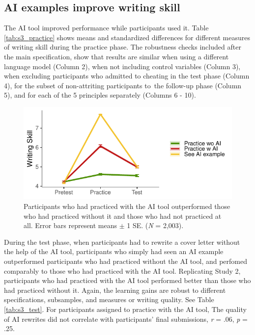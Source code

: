 \documentclass[11pt]{report}
\begin{document}
\begin{append}
\subsection{AI examples improve writing skill}

The AI tool improved performance while participants used it. Table \ref{tab:s3_practice} shows means and standardized differences for different measures of writing skill during the practice phase. The robustness checks included after the main specification, show that results are similar when using a different language model (Column 2), when not including control variables (Column 3), when excluding participants who admitted to cheating in the test phase (Column 4), for the subset of non-attriting participants to the follow-up phase (Column 5), and for each of the 5 principles separately (Columns 6 - 10).


\begin{figure}[ht]
    \centering
    \includegraphics[width=0.75\linewidth]{skill_lines_raw.pdf}
    \caption{Participants who had practiced with the AI tool outperformed those who had practiced without it and those who had not practiced at all.
    Error bars represent means $\pm$ 1 SE.
    (\textit{N} = 2,003).}
    \label{fig:s3sup}
\end{figure}

During the test phase, when participants had to rewrite a cover letter without the help of the AI tool, participants who simply had seen an AI example outperformed participants who had practiced without the AI tool, and perfomed comparably to those who had practiced with the AI tool. Replicating Study 2, participants who had practiced with the AI tool performed better than those who had practiced  without it. Again, the learning gains are robust to different specifications, subsamples, and measures or writing quality. See Table \ref{tab:s3_test}.
For participants assigned to practice with the AI tool, The quality of AI rewrites did not correlate with participants' final submissions, \textit{r} = .06, \textit{p} = .25.



\end{append}
\end{document}
